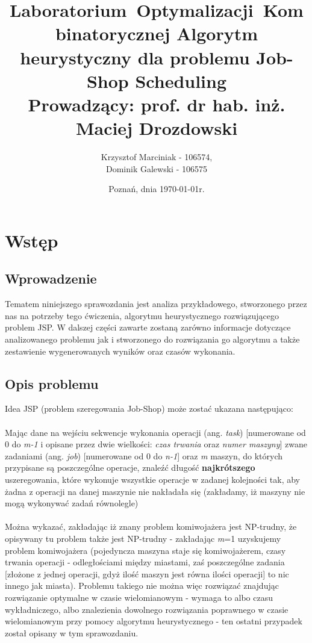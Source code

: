 \documentclass[a4paper,11pt]{article}
\title{\mbox{\textbf{Laboratorium Optymalizacji Kombinatorycznej}}\newline\newline
Algorytm heurystyczny dla problemu Job-Shop Scheduling\\
\Large{Prowadzący: prof. dr hab. inż. Maciej Drozdowski}}
\author{Krzysztof Marciniak - 106574,\\Dominik Galewski - 106575}
\date{Poznań, dnia \today\space{}r.}
\begin{document}
\maketitle
\section{Wstęp}
\subsection{Wprowadzenie}
Tematem niniejszego sprawozdania jest analiza przykładowego, stworzonego przez nas na potrzeby tego ćwiczenia, algorytmu heurystycznego rozwiązującego problem JSP. W dalszej części zawarte zostaną zarówno informacje dotyczące analizowanego problemu jak i stworzonego do rozwiązania go algorytmu a także zestawienie wygenerowanych wyników oraz czasów wykonania.
\subsection{Opis problemu}
Idea JSP (problem szeregowania Job-Shop) może zostać ukazana następująco:\\
\\
Mając dane na wejściu sekwencje wykonania operacji (ang. \emph{task}) [numerowane od 0 do \emph{m-1} i opisane przez dwie wielkości: \emph{czas trwania} oraz \emph{numer maszyny}] zwane zadaniami (ang. \emph{job}) [numerowane od 0 do \emph{n-1}] oraz \emph{m} maszyn, do których przypisane są poszczególne operacje, znaleźć długość \textbf{najkrótszego} uszeregowania, które wykonuje wszystkie operacje w zadanej kolejności tak, aby żadna z operacji na danej maszynie nie nakładała się (zakładamy, iż maszyny nie mogą wykonywać zadań równolegle)\\
\\
Można wykazać, zakładając iż znany problem komiwojażera jest NP-trudny, że opisywany tu problem także jest NP-trudny - zakładając \emph{m}=1 uzyskujemy problem komiwojażera (pojedyncza maszyna staje się komiwojażerem, czasy trwania operacji - odległościami między miastami, zaś poszczególne zadania [złożone z jednej operacji, gdyż ilość maszyn jest równa ilości operacji] to nic innego jak miasta). Problemu takiego nie można więc rozwiązać znajdując rozwiązanie optymalne w czasie wielomianowym - wymaga to albo czasu wykładniczego, albo znalezienia dowolnego rozwiązania poprawnego w czasie wielomianowym przy pomocy algorytmu heurystycznego - ten ostatni przypadek został opisany w tym sprawozdaniu.
\end{document}
